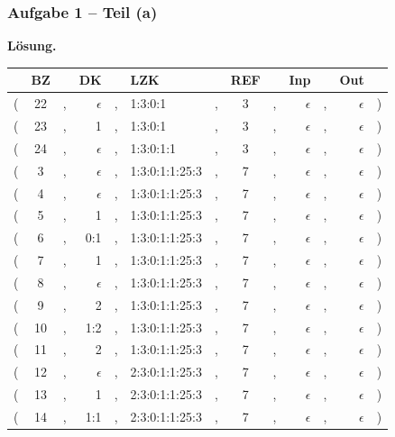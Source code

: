 \documentclass{beamer}
\newcommand*\head{\rowfont{\bfseries}}
\begin{document}
\begin{frame} \frametitle{Aufgabe 1 -- Teil (a)}
	\footnotesize
	\textbf{Lösung.}
	
	\scriptsize
	\begin{center}
		\begin{tabu}{rccrclcccrcrl}
			\head & BZ && DK && LZK && REF && Inp && Out & \\ \hline 
			( & 22 &,& $\epsilon$ &,& 1:3:0:1 &,& 3 &,& $\epsilon$ &,& $\epsilon$ & ) \\
			( & 23 &,& 1 &,& 1:3:0:1 &,& 3 &,& $\epsilon$ &,& $\epsilon$ & ) \\
			( & 24 &,& $\epsilon$ &,& 1:3:0:1:1 &,& 3 &,& $\epsilon$ &,& $\epsilon$ & ) \\
			( & 3 &,& $\epsilon$ &,& 1:3:0:1:1:25:3 &,& 7 &,& $\epsilon$ &,& $\epsilon$ & ) \\
			( & 4 &,& $\epsilon$ &,& 1:3:0:1:1:25:3 &,& 7 &,& $\epsilon$ &,& $\epsilon$ & ) \\
			( & 5 &,& 1 &,& 1:3:0:1:1:25:3 &,& 7 &,& $\epsilon$ &,& $\epsilon$ & ) \\
			( & 6 &,& 0:1 &,& 1:3:0:1:1:25:3 &,& 7 &,& $\epsilon$ &,& $\epsilon$ & ) \\
			( & 7 &,& 1 &,& 1:3:0:1:1:25:3 &,& 7 &,& $\epsilon$ &,& $\epsilon$ & ) \\
			( & 8 &,& $\epsilon$ &,& 1:3:0:1:1:25:3 &,& 7 &,& $\epsilon$ &,& $\epsilon$ & ) \\
			( & 9 &,& 2 &,& 1:3:0:1:1:25:3 &,& 7 &,& $\epsilon$ &,& $\epsilon$ & ) \\
			( & 10 &,& 1:2 &,& 1:3:0:1:1:25:3 &,& 7 &,& $\epsilon$ &,& $\epsilon$ & ) \\
			( & 11 &,& 2 &,& 1:3:0:1:1:25:3 &,& 7 &,& $\epsilon$ &,& $\epsilon$ & ) \\
			( & 12 &,& $\epsilon$ &,& 2:3:0:1:1:25:3 &,& 7 &,& $\epsilon$ &,& $\epsilon$ & ) \\
			\hline
			( & 13 &,& 1 &,& 2:3:0:1:1:25:3 &,& 7 &,& $\epsilon$ &,& $\epsilon$ & ) \\
			( & 14 &,& 1:1 &,& 2:3:0:1:1:25:3 &,& 7 &,& $\epsilon$ &,& $\epsilon$ & ) \\
		\end{tabu}
	\end{center}
\end{frame}
\end{document}
